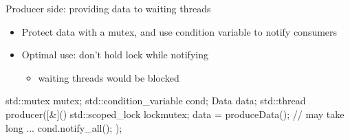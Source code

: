 \begin{frame}[fragile]
  \begin{block}{Producer side: providing data to waiting threads}
    \begin{itemize}
      \item Protect data with a mutex, and use condition variable to notify consumers
      \item Optimal use: don't hold lock while notifying
      \begin{itemize}
        \item waiting threads would be blocked
      \end{itemize}
    \end{itemize}
  \end{block}
  \begin{exampleblock}{}
    \begin{cppcode*}{}
      std::mutex mutex;
      std::condition_variable cond;
      Data data;
      std::thread producer([&](){
        {
          std::scoped_lock lock{mutex};
          data = produceData(); // may take long ...
        }
        cond.notify_all();
      });
    \end{cppcode*}
  \end{exampleblock}
\end{frame}


